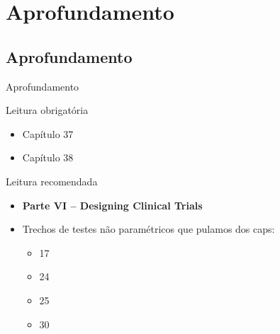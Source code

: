 \documentclass{beamer}
\begin{document}
\section{Aprofundamento}

\subsection{Aprofundamento}

\begin{frame}{\scriptsize Aprofundamento}
  \begin{block}{Leitura obrigatória}
    \footnotesize
    \begin{itemize}
      \footnotesize
    \item Capítulo 37
    \item Capítulo 38
    \end{itemize}
  \end{block}
  \begin{block}{Leitura recomendada}
    \begin{itemize}
      \scriptsize
    \item {\bf Parte VI -- Designing Clinical Trials}
    \scriptsize
    \item Trechos de testes não paramétricos que pulamos dos caps:
      \begin{itemize}
        \scriptsize
      \item 17
      \item 24
      \item 25
      \item 30
      \end{itemize}
    \end{itemize}
  \end{block}
\end{frame}
\end{document}
